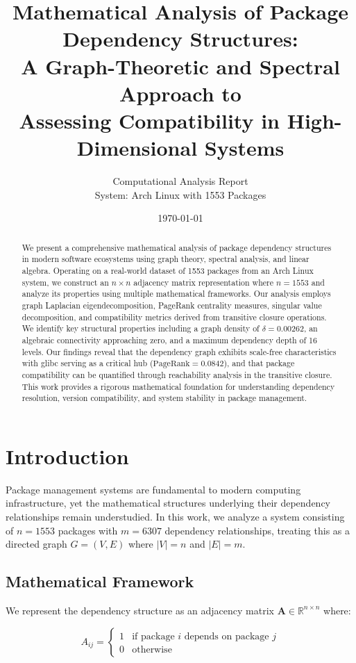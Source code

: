 \documentclass[11pt,a4paper]{article}
\title{Mathematical Analysis of Package Dependency Structures:\\
A Graph-Theoretic and Spectral Approach to\\
Assessing Compatibility in High-Dimensional Systems}
\author{Computational Analysis Report\\
System: Arch Linux with 1553 Packages}
\date{\today}
\begin{document}
\maketitle

\begin{abstract}
We present a comprehensive mathematical analysis of package dependency structures in modern software ecosystems using graph theory, spectral analysis, and linear algebra. Operating on a real-world dataset of 1553 packages from an Arch Linux system, we construct an $n \times n$ adjacency matrix representation where $n = 1553$ and analyze its properties using multiple mathematical frameworks. Our analysis employs graph Laplacian eigendecomposition, PageRank centrality measures, singular value decomposition, and compatibility metrics derived from transitive closure operations. We identify key structural properties including a graph density of $\delta = 0.00262$, an algebraic connectivity approaching zero, and a maximum dependency depth of 16 levels. Our findings reveal that the dependency graph exhibits scale-free characteristics with glibc serving as a critical hub ($\text{PageRank} = 0.0842$), and that package compatibility can be quantified through reachability analysis in the transitive closure. This work provides a rigorous mathematical foundation for understanding dependency resolution, version compatibility, and system stability in package management.
\end{abstract}

\section{Introduction}

Package management systems are fundamental to modern computing infrastructure, yet the mathematical structures underlying their dependency relationships remain understudied. In this work, we analyze a system consisting of $n = 1553$ packages with $m = 6307$ dependency relationships, treating this as a directed graph $G = (V, E)$ where $|V| = n$ and $|E| = m$.

\subsection{Mathematical Framework}

We represent the dependency structure as an adjacency matrix $\mathbf{A} \in \mathbb{R}^{n \times n}$ where:

\begin{equation}
A_{ij} = \begin{cases}
1 & \text{if package } i \text{ depends on package } j \\
0 & \text{otherwise}
\end{cases}
\end{equation}
\end{document}
